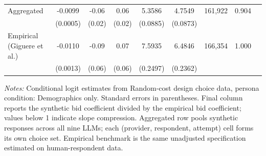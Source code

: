 \begin{table}[h]
{\begin{threeparttable}
\begin{tabular}{lcccccccr}
\midrule
Aggregated &   -0.0099 &     -0.06 &      0.06 &    5.3586 &    4.7549 &   161,922 &  0.904 \\
 & (0.0005) & (0.02) & (0.02) & (0.0885) & (0.0873) & & \\
\midrule
Empirical (Giguere et al.) &   -0.0110 &     -0.09 &      0.07 &    7.5935 &    6.4846 &   166,354 & 1.000 \\
 & (0.0013) & (0.06) & (0.06) & (0.2497) & (0.2362) & & \\
\bottomrule
\end{tabular}
\begin{tablenotes}\footnotesize
\item \textit{Notes:} Conditional logit estimates from Random-cost design choice data, persona condition: Demographics only. 
Standard errors in parentheses. 
Final column reports the synthetic bid coefficient divided by the empirical bid coefficient; values below 1 indicate slope compression. 
Aggregated row pools synthetic responses across all nine LLMs; each (provider, respondent, attempt) cell forms its own choice set. 
Empirical benchmark is the same unadjusted specification estimated on \textcite{Giguere2020} human-respondent data.
\end{tablenotes}
\end{threeparttable}
}
\end{table}
